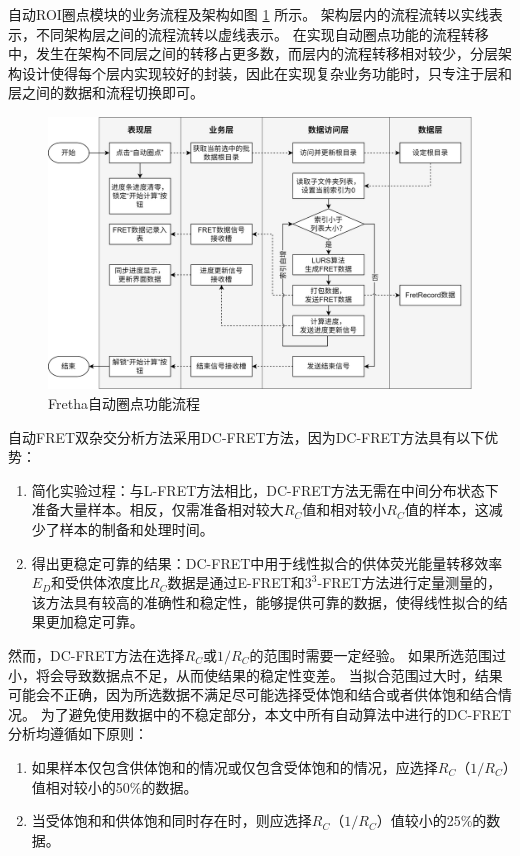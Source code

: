 自动ROI圈点模块的业务流程及架构如图 \ref{fig:fret_auto_roi_flow} 所示。
架构层内的流程流转以实线表示，不同架构层之间的流程流转以虚线表示。
在实现自动圈点功能的流程转移中，发生在架构不同层之间的转移占更多数，而层内的流程转移相对较少，分层架构设计使得每个层内实现较好的封装，因此在实现复杂业务功能时，只专注于层和层之间的数据和流程切换即可。
\begin{figure}[htbp]
    \centering
    \includegraphics[width=1\linewidth]{../figures/4/自动ROI圈点在Fretha的流程.drawio.png}
    \caption{Fretha自动圈点功能流程}
    \label{fig:fret_auto_roi_flow}
\end{figure}

自动FRET双杂交分析方法采用DC-FRET方法，因为DC-FRET方法具有以下优势：
\begin{enumerate}
    \item 简化实验过程：与L-FRET方法相比，DC-FRET方法无需在中间分布状态下准备大量样本。相反，仅需准备相对较大$R_C$值和相对较小$R_C$值的样本，这减少了样本的制备和处理时间。
    \item 得出更稳定可靠的结果：DC-FRET中用于线性拟合的供体荧光能量转移效率$E_D$和受供体浓度比$R_C$数据是通过E-FRET和$3^3$-FRET方法进行定量测量的，该方法具有较高的准确性和稳定性，能够提供可靠的数据，使得线性拟合的结果更加稳定可靠。
\end{enumerate}

然而，DC-FRET方法在选择$R_C$或$1/R_C$的范围时需要一定经验。
如果所选范围过小，将会导致数据点不足，从而使结果的稳定性变差。
当拟合范围过大时，结果可能会不正确，因为所选数据不满足尽可能选择受体饱和结合或者供体饱和结合情况。
为了避免使用数据中的不稳定部分，本文中所有自动算法中进行的DC-FRET分析均遵循如下原则：
\begin{enumerate}
    \item 如果样本仅包含供体饱和的情况或仅包含受体饱和的情况，应选择$R_C$（$1/R_C$）值相对较小的50\%的数据。
    \item 当受体饱和和供体饱和同时存在时，则应选择$R_C$（$1/R_C$）值较小的25\%的数据。
\end{enumerate}

